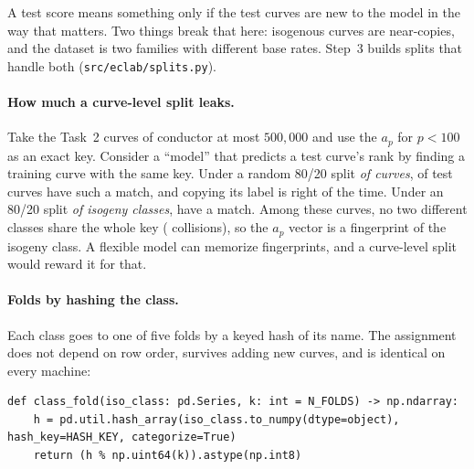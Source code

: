 \documentclass[11pt]{article}
\theoremstyle{definition}
\theoremstyle{plain}
\theoremstyle{remark}
\renewcommand{\_}{\oldunderscore\allowbreak}
\newcommand{\file}[1]{\textcolor{blue!50!black}{\texttt{#1}}}
\newcommand{\codefrom}[1]{\par\smallskip\noindent{\footnotesize\textbf{From} \file{#1}}}
\begin{document}
A test score means something only if the test curves are new to the model in the way that
matters. Two things break that here: isogenous curves are near-copies, and the dataset is two
families with different base rates. Step~3 builds splits that handle both
(\file{src/eclab/splits.py}).

\paragraph{How much a curve-level split leaks.}
Take the Task~2 curves of conductor at most $500{,}000$ and use the $a_p$ for $p<100$ as an exact
key. Consider a ``model'' that predicts a test curve's rank by finding a training curve with
the same key. Under a random 80/20 split \emph{of curves}, \CurveSplitMatch{} of test curves
have such a match, and copying its label is right \CurveSplitLookupAcc{} of the time. Under an
80/20 split \emph{of isogeny classes}, \ClassSplitMatch{} have a match. Among these curves,
no two different classes share the whole key (\SharedApKeys{} collisions), so the $a_p$
vector is a fingerprint of the isogeny class. A flexible model can memorize fingerprints, and
a curve-level split would reward it for that.

\paragraph{Folds by hashing the class.}
Each class goes to one of five folds by a keyed hash of its name. The assignment does not
depend on row order, survives adding new curves, and is identical on every machine:

\codefrom{src/eclab/splits.py}
\begin{lstlisting}
def class_fold(iso_class: pd.Series, k: int = N_FOLDS) -> np.ndarray:
    h = pd.util.hash_array(iso_class.to_numpy(dtype=object), hash_key=HASH_KEY, categorize=True)
    return (h % np.uint64(k)).astype(np.int8)
\end{lstlisting}
\end{document}

